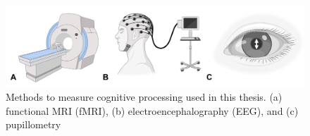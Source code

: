 \begin{figure}[!ht]
	\centering
	\includegraphics[width=1\textwidth, clip=true]{./Chapters/01_Introduction/Images/Methods}
	\caption{Methods to measure cognitive processing used in this thesis. (a) functional MRI (fMRI), (b) electroencephalography (EEG), and (c) pupillometry}
	\vspace*{-10pt}
	\label{fig:methods}
\end{figure}